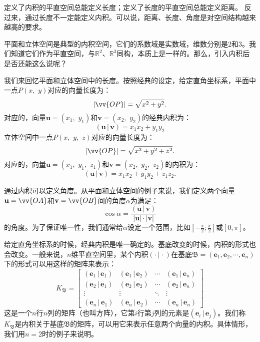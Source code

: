 \documentclass[12pt,UTF8]{ctexbook}
\newcommand{\nji}[2]{\displaystyle\left( #1 \,|\, #2\right)}
\theoremstyle{definition}
\theoremstyle{plain}
\begin{document}
定义了内积的平直空间总能定义长度；定义了长度的平直空间总能定义距离。
反过来，通过长度不一定能定义内积。可以说，距离、长度、角度是对空间结构越来越高的要求。

平面和立体空间是典型的内积空间，它们的系数域是实数域，维数分别是$2$和$3$。我们知道它们作为平直空间，与$\mathbb{R}^2$、$\mathbb{R}^3$同构，本质上是一样的。那么，引入内积后是否还能这么说呢？

我们来回忆平面和立体空间中的长度。按照经典的设定，给定直角坐标系，平面中一点$P(x, \,\,y)$对应的向量长度为：
$$ | \vv{OP} | = \sqrt{x^2 + y^2}.$$
对应的，向量$\mathbf{u} = (x_1, \,\,y_1)$和$\mathbf{v} = (x_2, \,\,y_2)$的经典内积为：
$$ \nji{\mathbf{u}}{\mathbf{v}} = x_1x_2 + y_1y_2 $$
立体空间中一点$P(x, \,\,y, \,\,z)$对应的向量长度为：
$$ | \vv{OP} | = \sqrt{x^2 + y^2 + z^2}.$$
对应的，向量$\mathbf{u} = (x_1, \,\,y_1,\,\,z_1)$和$\mathbf{v} = (x_2, \,\,y_2,\,\,z_2)$的内积为：
$$ \nji{\mathbf{u}}{\mathbf{v}} = x_1x_2 + y_1y_2 + z_1z_2.$$

通过内积可以定义角度。从平面和立体空间的例子来说，我们定义两个向量$\mathbf{u} = \vv{OA}$和$\mathbf{v} = \vv{OB}$间的角度$\alpha$为满足：
$$ \cos{\alpha } = \frac{\nji{\mathbf{u}}{\mathbf{v}}}{|\mathbf{u}|\cdot|\mathbf{v}|}$$
的角度。为了保证唯一性，我们通常给$\alpha$设定一个范围，比如$\left[-\frac{\pi}{2};\frac{\pi}{2}\right]$或$[0,\pi]$。

给定直角坐标系的时候，经典内积是唯一确定的。基底改变的时候，内积的形式也会改变。一般来说，$n$维平直空间里，某个内积$\nji{\cdot}{\cdot}$在基底$\mathfrak{B} = (\mathbf{e}_1, \mathbf{e}_2, \cdots, \mathbf{e}_n)$下的形式可以用这样的矩阵来表示：
$$ K_{\mathfrak{B}} = \begin{bmatrix}
    \nji{\mathbf{e}_1}{\mathbf{e}_1} & \nji{\mathbf{e}_1}{\mathbf{e}_2} & \cdots & \nji{\mathbf{e}_1}{\mathbf{e}_n} \\ \nji{\mathbf{e}_2}{\mathbf{e}_1} & \nji{\mathbf{e}_2}{\mathbf{e}_2} & \cdots & \nji{\mathbf{e}_2}{\mathbf{e}_n} \\ \vdots & \vdots & \ddots & \vdots \\ \nji{\mathbf{e}_n}{\mathbf{e}_1} & \nji{\mathbf{e}_n}{\mathbf{e}_2} & \cdots & \nji{\mathbf{e}_n}{\mathbf{e}_n} 
\end{bmatrix} $$
这是一个$n$行$n$列的矩阵（也叫方阵），它第$i$行第$j$列的元素是$\nji{\mathbf{e}_i}{\mathbf{e}_j}$。我们称$K_{\mathfrak{B}}$是内积关于基底$\mathfrak{B}$的矩阵，可以用它来表示任意两个向量的内积。具体情形，我们用$n=2$时的例子来说明。
\end{document}
